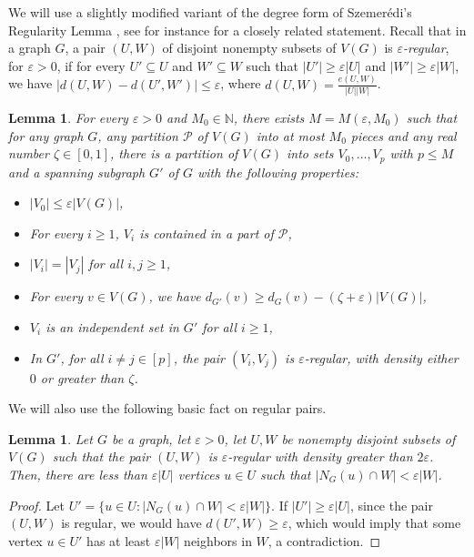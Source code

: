 \documentclass{article}
\newtheorem{lemma}[theorem]{Lemma}
\begin{document}
We will use a slightly modified variant of the degree form of Szemerédi's Regularity Lemma \cite{S75}, see for instance \cite{KS96} for a closely related statement.
Recall that in a graph $G$, a pair $(U, W)$ of disjoint nonempty subsets of $V(G)$ is  \emph{$\varepsilon$-regular}, for $\varepsilon > 0$, if for every $U' \subseteq U$ and $W' \subseteq W$ such that $|U'| \geq \varepsilon|U|$ and $|W'| \geq \varepsilon|W|$, we have $|d(U, W) - d(U', W')| \leq \varepsilon$, where $d(U, W) = \frac{e(U, W)}{|U||W|}$.

\begin{lemma}\label{lem:deg-regularity}
    For every $\varepsilon > 0$ and $M_0\in \mathbb{N}$, there exists $M = M(\varepsilon,M_0)$ such that for any graph $G$, any partition $\mathcal{P}$ of $V(G)$ into at most $M_0$ pieces and any real number $\zeta \in [0, 1]$, there is a partition of $V(G)$ into sets $V_0, \ldots, V_p$ with $p\le M$ and a spanning subgraph $G'$ of $G$ with the following properties: \begin{itemize}
        \item
         $|V_0| \leq \varepsilon |V(G)|$,
        \item For every $i \geq 1$, $V_i$ is contained in a part of $\mathcal{P}$,
        \item $|V_i| = |V_j|$ for all $i, j \geq 1$,
        \item For every $v \in V(G)$, we have $d_{G'}(v) \geq d_G(v) - (\zeta + \varepsilon)|V(G)|$,
        \item $V_i$ is an independent set in $G'$ for all $i \geq 1$, 
        \item In $G'$, for all $i \neq j \in [p]$, the pair $(V_i, V_j)$ is $\varepsilon$-regular, with density either $0$ or greater than $\zeta$.
    \end{itemize}
\end{lemma}

We will also use the following basic fact on regular pairs.

\begin{lemma}\label{lem:regular-few-sparse}
    Let $G$ be a graph, let $\varepsilon > 0$, let $U, W$ be nonempty disjoint subsets of $V(G)$ such that the pair $(U, W)$ is $\varepsilon$-regular with density greater than $2\varepsilon$.
    Then, there are less than $\varepsilon|U|$ vertices $u \in U$ such that $|N_G(u) \cap W| < \varepsilon|W|$.
\end{lemma}

\begin{proof}
    Let $U' = \{u \in U : |N_G(u) \cap W| < \varepsilon|W|\}$.
    If $|U'| \geq \varepsilon|U|$, since the pair $(U, W)$ is regular, we would have $d(U', W) \geq \varepsilon$, which would imply that some vertex $u \in U'$ has at least $\varepsilon|W|$ neighbors in $W$, a contradiction.
\end{proof}
\end{document}
